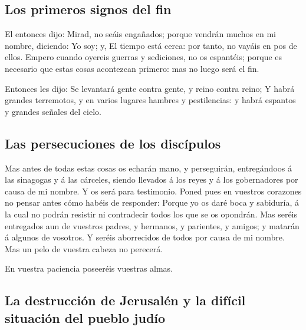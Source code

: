 \hypertarget{los-primeros-signos-del-fin}{%
\subsection{Los primeros signos del
fin}\label{los-primeros-signos-del-fin}}

 El entonces dijo: Mirad, no seáis engañados; porque
vendrán muchos en mi nombre, diciendo: Yo soy; y, El tiempo está cerca:
por tanto, no vayáis en pos de ellos.  Empero cuando
oyereis guerras y sediciones, no os espantéis; porque es necesario que
estas cosas acontezcan primero: mas no luego será el fin.

 Entonces les dijo: Se levantará gente contra gente, y
reino contra reino;  Y habrá grandes terremotos, y en
varios lugares hambres y pestilencias: y habrá espantos y grandes
señales del cielo.

\hypertarget{las-persecuciones-de-los-discuxedpulos}{%
\subsection{Las persecuciones de los
discípulos}\label{las-persecuciones-de-los-discuxedpulos}}

 Mas antes de todas estas cosas os echarán mano, y
perseguirán, entregándoos á las sinagogas y á las cárceles, siendo
llevados á los reyes y á los gobernadores por causa de mi nombre.
 Y os será para testimonio.  Poned pues en
vuestros corazones no pensar antes cómo habéis de responder:
 Porque yo os daré boca y sabiduría, á la cual no podrán
resistir ni contradecir todos los que se os opondrán. 
Mas seréis entregados aun de vuestros padres, y hermanos, y parientes, y
amigos; y matarán á algunos de vosotros.  Y seréis
aborrecidos de todos por causa de mi nombre.  Mas un pelo
de vuestra cabeza no perecerá.

 En vuestra paciencia poseeréis vuestras almas.

\hypertarget{la-destrucciuxf3n-de-jerusaluxe9n-y-la-difuxedcil-situaciuxf3n-del-pueblo-juduxedo}{%
\subsection{La destrucción de Jerusalén y la difícil situación del
pueblo
judío}\label{la-destrucciuxf3n-de-jerusaluxe9n-y-la-difuxedcil-situaciuxf3n-del-pueblo-juduxedo}}

